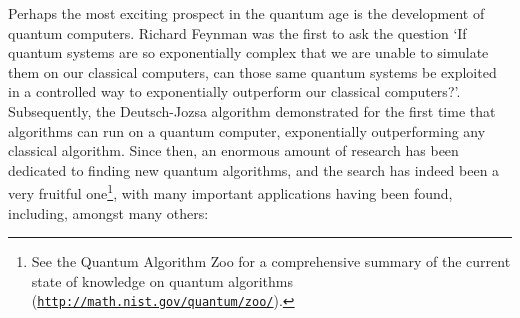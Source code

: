 \documentclass[aps,rmp,twocolumn,amsmath,amssymb,nofootinbib,superscriptaddress,longbibliography,floatfix,table-of-contents,eqsecnum]{revtex4-1}
\begin{document}
Perhaps the most exciting prospect in the quantum age is the development of quantum computers. Richard Feynman \cite{bib:Feynman85} was the first to ask the question `If quantum systems are so exponentially complex that we are unable to simulate them on our classical computers, can those same quantum systems be exploited in a controlled way to exponentially outperform our classical computers?'. Subsequently, the Deutsch-Jozsa algorithm \cite{bib:DeutschJozsa92} demonstrated for the first time that algorithms can run on a quantum computer, exponentially outperforming any classical algorithm. Since then, an enormous amount of research has been dedicated to finding new quantum algorithms, and the search has indeed been a very fruitful one\footnote{See the Quantum Algorithm Zoo for a comprehensive summary of the current state of knowledge on quantum algorithms (\texttt{\href{http://math.nist.gov/quantum/zoo/}{http://math.nist.gov/quantum/zoo/}}).}, with many important applications having been found, including, amongst many others:
\end{document}

